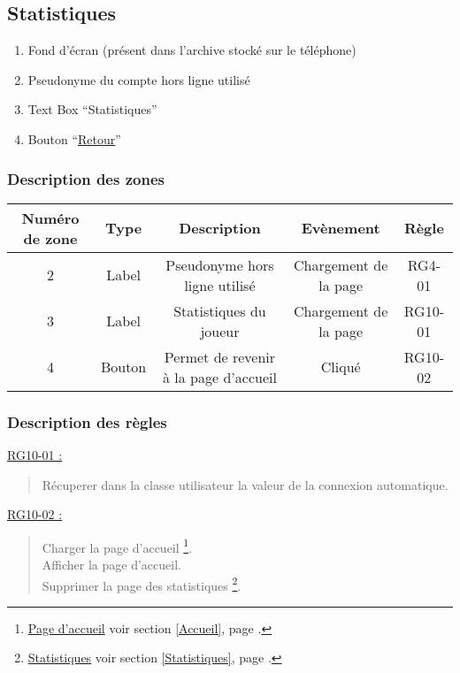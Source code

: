 \documentclass{report}
\begin{document}
\newpage

	\subsection{Statistiques}
		
		\hypertarget{Statistiques}{}
		\label{Statistiques}
			
		\begin{center}
			
		\end{center}
		
		\begin{enumerate}
		  \item Fond d'écran (présent dans l'archive stocké sur le téléphone)
		  \item Pseudonyme du compte hors ligne utilisé
		  \item Text Box ``Statistiques''
		  \item Bouton ``\hyperlink{Accueil}{Retour}''
		\end{enumerate}

		\subsubsection{Description des zones}
		
			\begin{tabular}{|c|c|c|c|c|} \hline
				Numéro de zone & Type  & Description & Evènement &	Règle \\\hline
				2 & Label & Pseudonyme hors ligne utilisé & Chargement de la page & RG4-01 \\\hline
				3 & Label & Statistiques du joueur & Chargement de la page & RG10-01 \\\hline
				4 & Bouton & Permet de revenir à la page d'accueil & Cliqué & RG10-02 \\\hline 
			\end{tabular}
			
		\subsubsection{Description des règles}

			\underline{RG10-01 :}
				\begin{quote}
					Récuperer dans la classe utilisateur la valeur de la connexion automatique.\\
				\end{quote}
				
			\underline{RG10-02 :}
				\begin{quote}
					Charger la page d'accueil%
						\footnote[3]{
							\hyperlink{Page d'accueil}{Page d'accueil}
							\og voir section \ref{Accueil}, page \pageref{Accueil}.\fg
						}.\\
					Afficher la page d'accueil\footnotemark[3].\\
					Supprimer la page des statistiques%
						\footnote[2]{
							\hyperlink{Statistiques}{Statistiques}
							\og voir section \ref{Statistiques}, page \pageref{Statistiques}.\fg
						}.\\		
				\end{quote}
	
\end{document}
